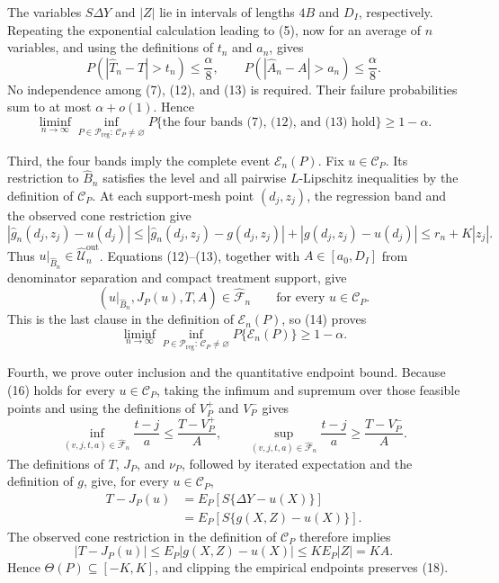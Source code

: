 The variables \(S\Delta Y\) and \(|Z|\) lie in intervals of lengths \(4B\) and \(D_I\), respectively.  Repeating the exponential calculation leading to (5), now for an average of \(n\) variables, and using the definitions of \(t_n\) and \(a_n\), gives
\[
 P(|\widehat T_n-T|>t_n)\le\frac{\alpha}{8},
 \qquad
 P(|\widehat A_n-A|>a_n)\le\frac{\alpha}{8}.                                  \tag{13}
\]
No independence among (7), (12), and (13) is required.  Their failure probabilities sum to at most \(\alpha+o(1)\).  Hence
\[
 \liminf_{n\to\infty}\inf_{P\in\mathcal P_{\mathrm{reg}}:\,\mathcal C_P\ne\varnothing}
 P\{\text{the four bands (7), (12), and (13) hold}\}\ge1-\alpha.               \tag{14}
\]

Third, the four bands imply the complete event \(\mathcal E_n(P)\).  Fix \(u\in\mathcal C_P\).  Its restriction to \(\widehat B_n\) satisfies the level and all pairwise \(L\)-Lipschitz inequalities by the definition of \(\mathcal C_P\).  At each support-mesh point \((d_j,z_j)\), the regression band and the observed cone restriction give
\[
 |\widehat g_n(d_j,z_j)-u(d_j)|
 \le |\widehat g_n(d_j,z_j)-g(d_j,z_j)|+|g(d_j,z_j)-u(d_j)|
 \le r_n+K|z_j|.                                                                  \tag{15}
\]
Thus \(u|_{\widehat B_n}\in\widehat{\mathcal U}_n^{\mathrm{out}}\).  Equations (12)--(13), together with \(A\in[a_0,D_I]\) from denominator separation and compact treatment support, give
\[
 (u|_{\widehat B_n},J_P(u),T,A)\in\widehat{\mathscr F}_n
 \qquad\text{for every }u\in\mathcal C_P.                                      \tag{16}
\]
This is the last clause in the definition of \(\mathcal E_n(P)\), so (14) proves
\[
 \liminf_{n\to\infty}\inf_{P\in\mathcal P_{\mathrm{reg}}:\,\mathcal C_P\ne\varnothing}
 P\{\mathcal E_n(P)\}\ge1-\alpha.                                             \tag{17}
\]

Fourth, we prove outer inclusion and the quantitative endpoint bound.  Because (16) holds for every \(u\in\mathcal C_P\), taking the infimum and supremum over those feasible points and using the definitions of \(V_P^+\) and \(V_P^-\) gives
\[
 \inf_{(v,j,t,a)\in\widehat{\mathscr F}_n}\frac{t-j}{a}
 \le \frac{T-V_P^+}{A},
 \qquad
 \sup_{(v,j,t,a)\in\widehat{\mathscr F}_n}\frac{t-j}{a}
 \ge \frac{T-V_P^-}{A}.                                                         \tag{18}
\]
The definitions of \(T\), \(J_P\), and \(\nu_P\), followed by iterated expectation and the definition of \(g\), give, for every \(u\in\mathcal C_P\),
\[
\begin{aligned}
 T-J_P(u)
 &=E_P[S\{\Delta Y-u(X)\}]\\
 &=E_P[S\{g(X,Z)-u(X)\}].
\end{aligned}
\]
The observed cone restriction in the definition of \(\mathcal C_P\) therefore implies
\[
 |T-J_P(u)|
 \le E_P|g(X,Z)-u(X)|
 \le K E_P|Z|=KA.                                                               \tag{18a}
\]
Hence \(\Theta(P)\subseteq[-K,K]\), and clipping the empirical endpoints preserves (18).

